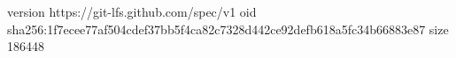 version https://git-lfs.github.com/spec/v1
oid sha256:1f7ecee77af504cdef37bb5f4ca82c7328d442ce92defb618a5fc34b66883e87
size 186448
